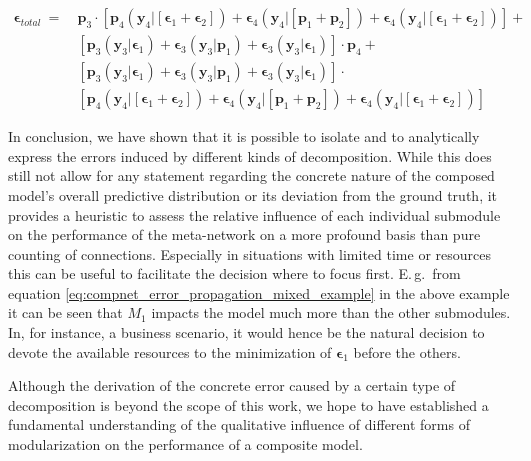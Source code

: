 \begin{equation}
\label{eq:compnet_error_propagation_mixed_example}
\begin{split}
    \boldsymbol{\epsilon}_{total}\ =\  &
    \textbf{p}_3\cdot[\textbf{p}_4(\textbf{y}_4|[\boldsymbol{\epsilon}_1+\boldsymbol{\epsilon}_2])+\boldsymbol{\epsilon}_4(\textbf{y}_4|[\textbf{p}_1+\textbf{p}_2])+\boldsymbol{\epsilon}_4(\textbf{y}_4|[\boldsymbol{\epsilon}_1+\boldsymbol{\epsilon}_2])]+\\
    & [\textbf{p}_3(\textbf{y}_3|\boldsymbol{\epsilon}_1)+  \boldsymbol{\epsilon}_3(\textbf{y}_3|\textbf{p}_1)+\boldsymbol{\epsilon}_3(\textbf{y}_3|\boldsymbol{\epsilon}_1)]\cdot\textbf{p}_4+\\
    & [\textbf{p}_3(\textbf{y}_3|\boldsymbol{\epsilon}_1)+\boldsymbol{\epsilon}_3(\textbf{y}_3|\textbf{p}_1)+\boldsymbol{\epsilon}_3(\textbf{y}_3|\boldsymbol{\epsilon}_1)]\cdot\\
    & [\textbf{p}_4(\textbf{y}_4|[\boldsymbol{\epsilon}_1+\boldsymbol{\epsilon}_2])+\boldsymbol{\epsilon}_4(\textbf{y}_4|[\textbf{p}_1+\textbf{p}_2])+\boldsymbol{\epsilon}_4(\textbf{y}_4|[\boldsymbol{\epsilon}_1+\boldsymbol{\epsilon}_2])]
\end{split}
\end{equation}

In conclusion, we have shown that it is possible to isolate and to analytically express the errors induced by different kinds of decomposition. While this does still not allow for any statement regarding the concrete nature of the composed model's overall predictive distribution or its deviation from the ground truth, it provides a heuristic to assess the relative influence of each individual submodule on the performance of the meta-network on a more profound basis than pure counting of connections. Especially in situations with limited time or resources this can be useful to facilitate the decision where to focus first. E.\,g.\ from equation \ref{eq:compnet_error_propagation_mixed_example} in the above example it can be seen that $M_1$ impacts the model much more than the other submodules. In, for instance, a business scenario, it would hence be the natural decision to devote the available resources to the minimization of $\boldsymbol{\epsilon}_1$ before the others.

Although the derivation of the concrete error caused by a certain type of decomposition is beyond the scope of this work, we hope to have established a fundamental understanding of the qualitative influence of different forms of modularization on the performance of a composite model.


